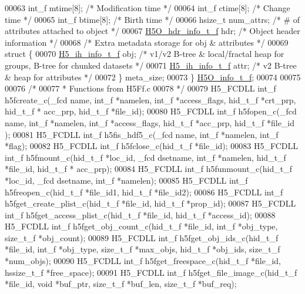 \begin{DoxyCode}
00063     int\_f       mtime[8];   \textcolor{comment}{/* Modification time        */}
00064     int\_f       ctime[8];   \textcolor{comment}{/* Change time          */}
00065     int\_f       btime[8];   \textcolor{comment}{/* Birth time           */}
00066     hsize\_t         num\_attrs;  \textcolor{comment}{/* # of attributes attached to object */}
00067     \hyperlink{struct_h5_o__hdr__info__t__f}{H5O\_hdr\_info\_t\_f}    hdr;            \textcolor{comment}{/* Object header information */}
00068     \textcolor{comment}{/* Extra metadata storage for obj & attributes */}
00069     \textcolor{keyword}{struct }\{
00070         \hyperlink{struct_h5__ih__info__t__f}{H5\_ih\_info\_t\_f}   obj;             \textcolor{comment}{/* v1/v2 B-tree & local/fractal heap for groups,
       B-tree for chunked datasets */}
00071         \hyperlink{struct_h5__ih__info__t__f}{H5\_ih\_info\_t\_f}   attr;            \textcolor{comment}{/* v2 B-tree & heap for attributes */}
00072     \} meta\_size;
00073 \} \hyperlink{struct_h5_o__info__t__f}{H5O\_info\_t\_f};
00074 
00075 
00076 \textcolor{comment}{/*}
00077 \textcolor{comment}{ *  Functions from H5Ff.c}
00078 \textcolor{comment}{ */}
00079 H5\_FCDLL int\_f h5fcreate\_c(\_fcd name, int\_f *namelen, int\_f *access\_flags, hid\_t\_f *crt\_prp, hid\_t\_f *
      acc\_prp, hid\_t\_f *file\_id);
00080 H5\_FCDLL int\_f h5fopen\_c(\_fcd name, int\_f *namelen, int\_f *access\_flags, hid\_t\_f *acc\_prp, hid\_t\_f *file\_id
      );
00081 H5\_FCDLL int\_f h5fis\_hdf5\_c(\_fcd name, int\_f *namelen, int\_f *flag);
00082 H5\_FCDLL int\_f h5fclose\_c(hid\_t\_f *file\_id);
00083 H5\_FCDLL int\_f h5fmount\_c(hid\_t\_f *loc\_id, \_fcd dsetname, int\_f *namelen, hid\_t\_f *file\_id, hid\_t\_f *
      acc\_prp);
00084 H5\_FCDLL int\_f h5funmount\_c(hid\_t\_f *loc\_id, \_fcd dsetname, int\_f *namelen);
00085 H5\_FCDLL int\_f h5freopen\_c(hid\_t\_f *file\_id1, hid\_t\_f *file\_id2);
00086 H5\_FCDLL int\_f h5fget\_create\_plist\_c(hid\_t\_f *file\_id, hid\_t\_f *prop\_id);
00087 H5\_FCDLL int\_f h5fget\_access\_plist\_c(hid\_t\_f *file\_id, hid\_t\_f *access\_id);
00088 H5\_FCDLL int\_f h5fget\_obj\_count\_c(hid\_t\_f *file\_id, int\_f *obj\_type, size\_t\_f *obj\_count);
00089 H5\_FCDLL int\_f h5fget\_obj\_ids\_c(hid\_t\_f *file\_id, int\_f *obj\_type, size\_t\_f *max\_objs, hid\_t\_f *obj\_ids, 
      size\_t\_f *num\_objs);
00090 H5\_FCDLL int\_f h5fget\_freespace\_c(hid\_t\_f *file\_id, hssize\_t\_f *free\_space);
00091 H5\_FCDLL int\_f h5fget\_file\_image\_c(hid\_t\_f *file\_id, \textcolor{keywordtype}{void} *buf\_ptr, size\_t\_f *buf\_len, size\_t\_f *buf\_req);

\end{DoxyCode}
